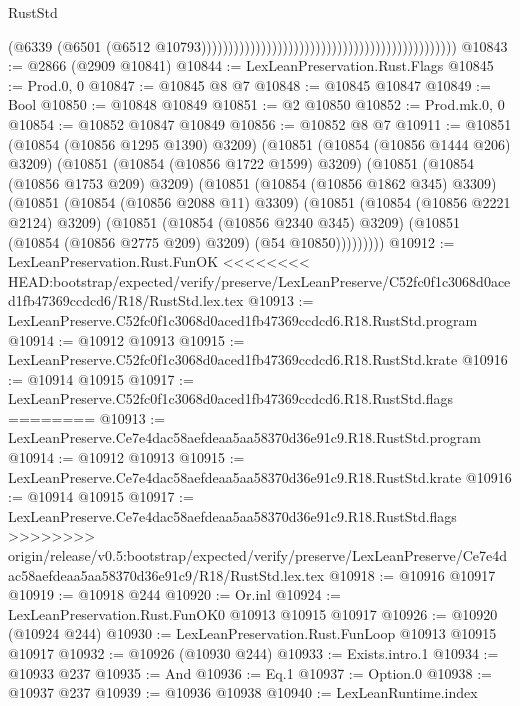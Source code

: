 \begin{lexlean}{RustStd}
\begin{coremodule}
{\begin{coremodule}
{{{{{{{{{{{{{{{{{{{{{{{{{{{{{{{{{{{{{{{{{{{{{{{{{{{{{{{{{{{{{{{{{{{{{{{{{{{{{{{{{{{{{                                                                                            (@6339
                                                                                              (@6501
                                                                                                (@6512
                                                                                                  @10793)))))))))))))))))))))))))))))))))))))))))))))))
@10843 := @2866 (@2909 @10841)
@10844 := LexLeanPreservation.Rust.Flags
@10845 := Prod.{0, 0}
@10847 := @10845 @8 @7
@10848 := @10845 @10847
@10849 := Bool
@10850 := @10848 @10849
@10851 := @2 @10850
@10852 := Prod.mk.{0, 0}
@10854 := @10852 @10847 @10849
@10856 := @10852 @8 @7
@10911 := @10851
    (@10854 (@10856 @1295 @1390) @3209)
    (@10851
      (@10854 (@10856 @1444 @206) @3209)
      (@10851
        (@10854 (@10856 @1722 @1599) @3209)
        (@10851
          (@10854 (@10856 @1753 @209) @3209)
          (@10851
            (@10854 (@10856 @1862 @345) @3309)
            (@10851
              (@10854 (@10856 @2088 @11) @3309)
              (@10851
                (@10854 (@10856 @2221 @2124) @3209)
                (@10851
                  (@10854 (@10856 @2340 @345) @3209)
                  (@10851 (@10854 (@10856 @2775 @209) @3209) (@54 @10850)))))))))
@10912 := LexLeanPreservation.Rust.FunOK
<<<<<<<< HEAD:bootstrap/expected/verify/preserve/LexLeanPreserve/C52fc0f1c3068d0aced1fb47369ccdcd6/R18/RustStd.lex.tex
@10913 := LexLeanPreserve.C52fc0f1c3068d0aced1fb47369ccdcd6.R18.RustStd.program
@10914 := @10912 @10913
@10915 := LexLeanPreserve.C52fc0f1c3068d0aced1fb47369ccdcd6.R18.RustStd.krate
@10916 := @10914 @10915
@10917 := LexLeanPreserve.C52fc0f1c3068d0aced1fb47369ccdcd6.R18.RustStd.flags
========
@10913 := LexLeanPreserve.Ce7e4dac58aefdeaa5aa58370d36e91c9.R18.RustStd.program
@10914 := @10912 @10913
@10915 := LexLeanPreserve.Ce7e4dac58aefdeaa5aa58370d36e91c9.R18.RustStd.krate
@10916 := @10914 @10915
@10917 := LexLeanPreserve.Ce7e4dac58aefdeaa5aa58370d36e91c9.R18.RustStd.flags
>>>>>>>> origin/release/v0.5:bootstrap/expected/verify/preserve/LexLeanPreserve/Ce7e4dac58aefdeaa5aa58370d36e91c9/R18/RustStd.lex.tex
@10918 := @10916 @10917
@10919 := @10918 @244
@10920 := Or.inl
@10924 := LexLeanPreservation.Rust.FunOK0 @10913 @10915 @10917
@10926 := @10920 (@10924 @244)
@10930 := LexLeanPreservation.Rust.FunLoop @10913 @10915 @10917
@10932 := @10926 (@10930 @244)
@10933 := Exists.intro.{1}
@10934 := @10933 @237
@10935 := And
@10936 := Eq.{1}
@10937 := Option.{0}
@10938 := @10937 @237
@10939 := @10936 @10938
@10940 := LexLeanRuntime.index
}}}}}}}}}}}}}}}}}}}}}}}}}}}}}}}}}}}}}}}}}}}}}}}}}}}}}}}}}}}}}}}}}}}}}}}}}}}}}}}}}}}}}
\end{coremodule}}
\end{coremodule}
\end{lexlean}
